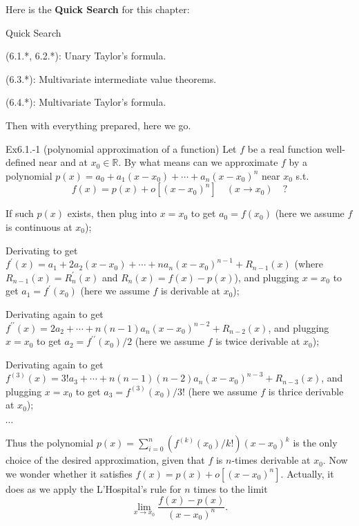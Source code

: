 \documentclass{article}
\begin{document}
Here is the \textbf{Quick Search} for this chapter:
\begin{Th}{Quick Search}
    \begin{compactdesc}
        \item (6.1.*, 6.2.*): Unary Taylor's formula.
        \item (6.3.*): Multivariate intermediate value theorems.
        \item (6.4.*): Multivariate Taylor's formula.
    \end{compactdesc}
\end{Th}

Then with everything prepared, here we go. 

\begin{Th}{Ex6.1.-1 (polynomial approximation of a function)}
    Let $f$ be a real function well-defined near and at $x_0\in\mathbb{R}$. By what means can we approximate $f$ by a polynomial $p(x) = a_0 + a_1(x-x_0) + \cdots + a_n(x-x_0)^n$ near $x_0$ s.t. 
    $$ f(x) = p(x) + o[(x-x_0)^n]\quad (x\rightarrow x_0)\quad ? $$
    \tcblower
    \begin{compactenum}
        \item If such $p(x)$ exists, then plug into $x = x_0$ to get $a_0 = f(x_0)$ (here we assume $f$ is continuous at $x_0$);
        \item Derivating to get $f^\prime (x) = a_1 + 2a_2(x-x_0) + \cdots + na_n(x-x_0)^{n-1} + R_{n-1}(x) $ (where $R_{n-1}(x) = R_n^\prime (x)$ and $R_n(x) = f(x) - p(x)$), and plugging $x = x_0$ to get $a_1 = f^\prime (x_0)$ (here we assume $f$ is derivable at $x_0$);
        \item Derivating again to get $f^{\prime\prime} (x) = 2a_2 + \cdots + n(n-1)a_n(x-x_0)^{n-2} + R_{n-2}(x)$, and plugging $x = x_0$ to get $a_2 = f^{\prime\prime} (x_0)/2$ (here we assume $f$ is twice derivable at $x_0$);
        \item Derivating again to get $f^{(3)} (x) = 3!a_3 + \cdots + n(n-1)(n-2)a_n(x-x_0)^{n-3} + R_{n-3}(x)$, and plugging $x = x_0$ to get $a_3 = f^{(3)} (x_0)/3!$ (here we assume $f$ is thrice derivable at $x_0$);
        \item $\cdots$
    \end{compactenum}
    Thus the polynomial $p(x) = \sum_{i=0}^{n} \left(f^{(k)}(x_0)/k!\right) (x-x_0)^k$ is the only choice of the desired approximation, given that $f$ is $n$-times derivable at $x_0$. Now we wonder whether it satisfies $f(x) = p(x) + o[(x-x_0)^n]$. Actually, it does as we apply the L'Hospital's rule for $n$ times to the limit
    $$ \lim\limits_{x\to x_0}\frac{f(x)-p(x)}{(x-x_0)^n}. $$
\end{Th}
\end{document}
